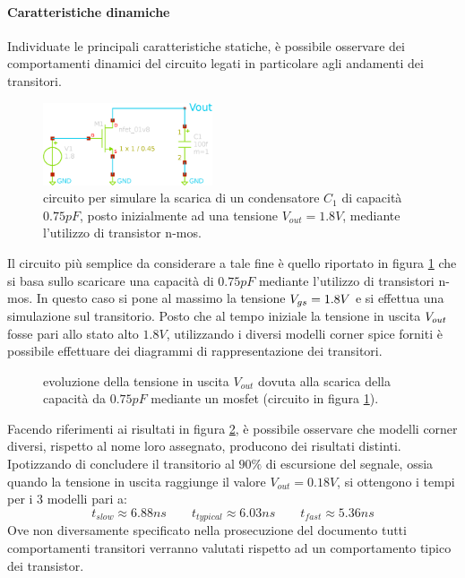 	
		\paragraph{Caratteristiche dinamiche} Individuate le principali caratteristiche statiche, è possibile osservare dei comportamenti dinamici del circuito legati in particolare agli andamenti dei transitori.
	
		
		\begin{figure}[bht]
			\centering
			\includegraphics[width=5cm]{Immagini/circuito_transitorio.eps}
			\caption{circuito per simulare la scarica di un condensatore $C_1$ di capacità $0.75pF$, posto inizialmente ad una tensione $V_{out} = 1.8V$, mediante l'utilizzo di transistor n-mos.} \label{fig:intro:schematico-transitorio}
		\end{figure}
	
		Il circuito più semplice da considerare a tale fine è quello riportato in figura \ref{fig:intro:schematico-transitorio} che si basa sullo scaricare una capacità di $0.75pF$ mediante l'utilizzo di transistori n-mos. In questo caso si pone al massimo la tensione $V_{gs} = 1.8V$ e si effettua una simulazione sul transitorio. Posto che al tempo iniziale la tensione in uscita $V_{out}$ fosse pari allo stato alto $1.8V$, utilizzando i diversi modelli corner spice forniti è possibile effettuare dei diagrammi di rappresentazione dei transitori.
	
		\begin{figure}[bht]
			\centering
			
			\caption{evoluzione della tensione in uscita $V_{out}$ dovuta alla scarica della capacità da $0.75pF$ mediante un mosfet (circuito in figura \ref{fig:intro:schematico-transitorio}).}
			\label{fig:intro:nmos-tempitransitorio}
		\end{figure}
	
		Facendo riferimenti ai risultati in figura \ref{fig:intro:nmos-tempitransitorio}, è possibile osservare che modelli corner diversi, rispetto al nome loro assegnato, producono dei risultati distinti. Ipotizzando di concludere il transitorio al $90\%$ di escursione del segnale, ossia quando la tensione in uscita raggiunge il valore $V_{out} = 0.18V$, si ottengono i tempi per i 3 modelli pari a:
		\[ t_{slow} \approx 6.88ns \qquad t_{typical} \approx 6.03ns \qquad t_{fast} \approx 5.36 ns  \] 
		Ove non diversamente specificato nella prosecuzione del documento tutti comportamenti transitori verranno valutati rispetto ad un comportamento tipico dei transistor.
		
	
	
	
	
	
	
	